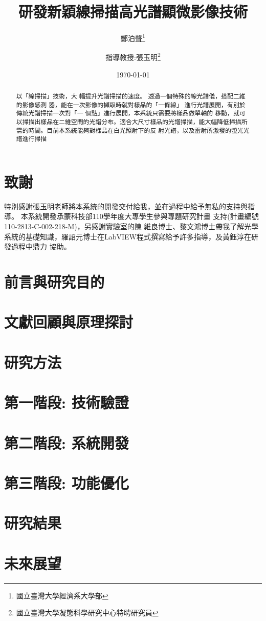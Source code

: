 \documentclass[12pt]{article}
\title{研發新穎線掃描高光譜顯微影像技術}
\author{鄭泊聲\thanks{國立臺灣大學經濟系大學部}
\and 指導教授:張玉明\thanks{國立臺灣大學凝態科學研究中心特聘研究員}}
\date{\today}
\begin{document}
    \maketitle
    \begin{abstract}
        以「線掃描」技術，大
幅提升光譜掃描的速度。
透過一個特殊的線光譜儀，搭配二維的影像感測
器，能在一次影像的擷取時就對樣品的「一條線」
進行光譜展開，有別於傳統光譜掃描一次對「一
個點」進行展開，本系統只需要將樣品做單軸的
移動，就可以掃描出樣品在二維空間的光譜分布。適合大尺寸樣品的光譜掃描，能大幅降低掃描所需的時間。目前本系統能夠對樣品在白光照射下的反
射光譜，以及雷射所激發的螢光光譜進行掃描
    \end{abstract}
    \section*{致謝}
    特別感謝張玉明老師將本系統的開發交付給我，並在過程中給予無私的支持與指導。
    本系統開發承蒙科技部110學年度大專學生參與專題研究計畫
支持(計畫編號110-2813-C-002-218-M)，另感謝實驗室的陳
維良博士、黎文鴻博士帶我了解光學系統的基礎知識，羅詔元博士在LabVIEW程式撰寫給予許多指導，及黃鈺淳在研發過程中鼎力
協助。
    \section{前言與研究目的}
    \section{文獻回顧與原理探討}
    \section{研究方法}
    \section{第一階段: 技術驗證}
    \section{第二階段: 系統開發}
    \section{第三階段: 功能優化}
    \section{研究結果}
    \section{未來展望}
\end{document}
